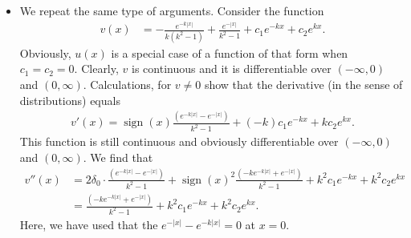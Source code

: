 \documentclass[11pt]{article}
\begin{document}
\begin{solution}
\begin{itemize}
    \item 
    We repeat the same type of arguments.
    Consider the function 
    \begin{align*}
        v(x) 
        &= 
        - \frac{ e^{-k|x|} }{ k (k^2-1) } 
        + 
        \frac{ e^{-|x|} }{ k^2-1 } 
        + 
        c_1 e^{-kx} 
        + 
        c_2 e^{kx}
        .
    \end{align*}
    Obviously, $u(x)$ is a special case of a function of that form when $c_1 = c_2 = 0$. 
    Clearly, $v$ is continuous and it is differentiable over $(-\infty,0)$ and $(0,\infty)$. 
    Calculations, for $v \neq 0$ show that the derivative (in the sense of distributions) equals 
    \begin{align*}
        v'(x)
        =
        \operatorname{sign}(x) \frac{ \left( e^{-k|x|} -  e^{-|x|} \right) }{ k^{2}-1 }
        + 
        (-k) c_1 e^{-kx} 
        + 
          k  c_2 e^{kx}
        .
    \end{align*}
    This function is still continuous and obviously differentiable over $(-\infty,0)$ and $(0,\infty)$. 
    We find that 
    \begin{align*}
        v''(x)
        &=
        2\delta_{0} \cdot \frac{ \left( e^{-k|x|} -  e^{-|x|} \right) }{ k^{2}-1 }
        +
        \operatorname{sign}(x)^{2} \frac{ \left( - k e^{-k|x|} + e^{-|x|} \right) }{ k^{2}-1 }
        + 
        k^{2} c_1 e^{-kx} 
        + 
        k^{2} c_2 e^{kx}
        \\&
        =
        \frac{ \left( - k e^{-k|x|} + e^{-|x|} \right) }{ k^{2}-1 }
        + 
        k^{2} c_1 e^{-kx} 
        + 
        k^{2} c_2 e^{kx}
        .
    \end{align*}
    Here, we have used that the $e^{-|x|} - e^{-k|x|} = 0$ at $x=0$. 
    

\end{itemize}
\end{solution}
\end{document}
